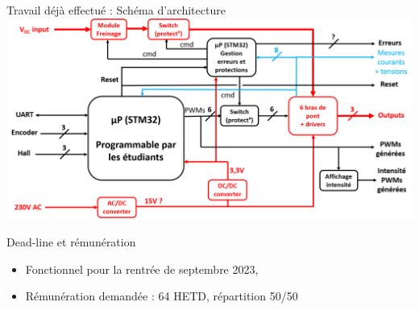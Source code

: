 \documentclass[aspectratio=169]{beamer}
\begin{document}
\begin{frame}{Travail déjà effectué : Schéma d'architecture}
\includegraphics[width=\linewidth]{Architecture.png} 
\end{frame}

\begin{frame}{Dead-line et rémunération}
\begin{itemize}
	\item Fonctionnel pour la rentrée de septembre 2023,
	\item Rémunération demandée : 64 HETD, répartition 50/50
\end{itemize}

\end{frame}
\end{document}
